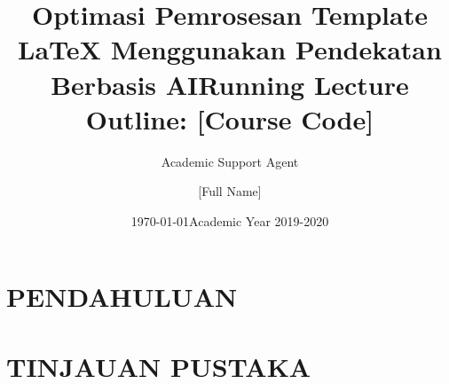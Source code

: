 \documentclass{article}
\title{Optimasi Pemrosesan Template LaTeX Menggunakan Pendekatan Berbasis AI}
\author{Academic Support Agent}
\date{\today}
\begin{document}
\maketitle

\begin{abstract}

\end{abstract}

\chapter{PENDAHULUAN}


\chapter{TINJAUAN PUSTAKA}


\usepackage{amsmath, amsthm, amssymb, calrsfs, wasysym, verbatim, bbm, color, graphics, geometry}

\geometry{tmargin=.75in, bmargin=.75in, lmargin=.75in, rmargin = .75in}  

\newcommand{\R}{\mathbb{R}}
\newcommand{\C}{\mathbb{C}}
\newcommand{\Z}{\mathbb{Z}}
\newcommand{\N}{\mathbb{N}}
\newcommand{\Q}{\mathbb{Q}}
\newcommand{\Cdot}{\boldsymbol{\cdot}}

\newtheorem{thm}{Theorem}
\newtheorem{defn}{Definition}
\newtheorem{conv}{Convention}
\newtheorem{rem}{Remark}
\newtheorem{lem}{Lemma}
\newtheorem{cor}{Corollary}


\title{Running Lecture Outline: [Course Code]}
\author{[Full Name]}
\date{Academic Year 2019-2020}
\end{document}
